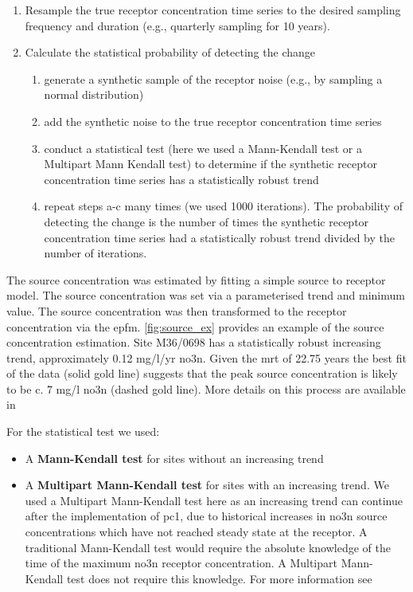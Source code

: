 \begin{enumerate}
    \item Resample the true receptor concentration time series to the desired sampling frequency and duration (e.g., quarterly sampling for 10 years).
    \item Calculate the statistical probability of detecting the change
    \begin{enumerate}
        \item generate a synthetic sample of the receptor noise (e.g., by sampling a normal distribution)
        \item add the synthetic noise to the true receptor concentration time series
        \item conduct a statistical test (here we used a Mann-Kendall test or a Multipart Mann Kendall test) to determine if the synthetic receptor concentration time series has a statistically robust trend
        \item repeat steps a-c many times (we used 1000 iterations). The probability of detecting the change is the number of times the synthetic receptor concentration time series had a statistically robust trend divided by the number of iterations.
    \end{enumerate}
\end{enumerate}

The source concentration was estimated by fitting a simple source to receptor model. The source concentration was set via a parameterised trend and minimum value. The source concentration was then transformed to the receptor concentration via the \gls{epfm}. \autoref{fig:source_ex} provides an example of the source concentration estimation. Site M36/0698 has a statistically robust increasing trend, approximately 0.12 mg/l/yr \gls{no3n}. Given the \gls{mrt} of 22.75 years the best fit of the data (solid gold line) suggests that the peak source concentration is likely to be c. 7 mg/l \gls{no3n} (dashed gold line). More details on this process are available in \citet{dumont_determining_nodate, dumont_komanawagw_age_tools_2023}


For the statistical test we used:
\begin{itemize}
    \item A \textbf{Mann-Kendall test} for sites without an  increasing trend
    \item A \textbf{Multipart Mann-Kendall test} for sites with an increasing trend. We used a Multipart Mann-Kendall test here as an increasing trend can continue after the implementation of \gls{pc1}, due to historical increases in \gls{no3n} source concentrations which have not reached steady state at the receptor. A traditional Mann-Kendall test would require the absolute knowledge of the time of the maximum \gls{no3n} receptor concentration. A Multipart Mann-Kendall test does not require this knowledge. For more information see \citet{dumont_komanawakendall_stats_2023}
\end{itemize}

